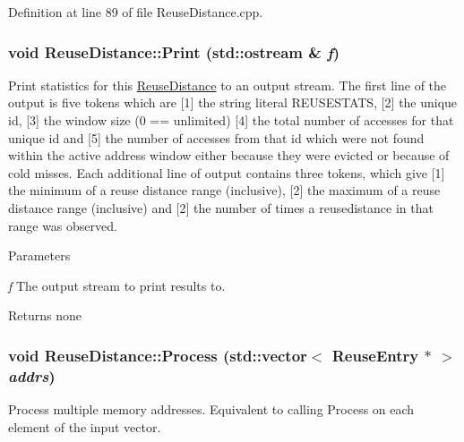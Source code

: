 Definition at line 89 of file ReuseDistance.cpp.\hypertarget{class_reuse_distance_ac798c03bb891a51a6648df4b49e25212}{
\subsubsection[{Print}]{\setlength{\rightskip}{0pt plus 5cm}void ReuseDistance::Print (std::ostream \& {\em f})}}
\label{class_reuse_distance_ac798c03bb891a51a6648df4b49e25212}
Print statistics for this \hyperlink{class_reuse_distance}{ReuseDistance} to an output stream. The first line of the output is five tokens which are \mbox{[}1\mbox{]} the string literal REUSESTATS, \mbox{[}2\mbox{]} the unique id, \mbox{[}3\mbox{]} the window size (0 == unlimited) \mbox{[}4\mbox{]} the total number of accesses for that unique id and \mbox{[}5\mbox{]} the number of accesses from that id which were not found within the active address window either because they were evicted or because of cold misses. Each additional line of output contains three tokens, which give \mbox{[}1\mbox{]} the minimum of a reuse distance range (inclusive), \mbox{[}2\mbox{]} the maximum of a reuse distance range (inclusive) and \mbox{[}2\mbox{]} the number of times a reusedistance in that range was observed.


\begin{DoxyParams}{Parameters}
\item[{\em f}]The output stream to print results to.\end{DoxyParams}
\begin{DoxyReturn}{Returns}
none 
\end{DoxyReturn}
\hypertarget{class_reuse_distance_a88052f5ae1e69bab8fe1f9b7b87c1037}{
\subsubsection[{Process}]{\setlength{\rightskip}{0pt plus 5cm}void ReuseDistance::Process (std::vector$<$ {\bf ReuseEntry} $\ast$ $>$ {\em addrs})}}
\label{class_reuse_distance_a88052f5ae1e69bab8fe1f9b7b87c1037}
Process multiple memory addresses. Equivalent to calling Process on each element of the input vector.


